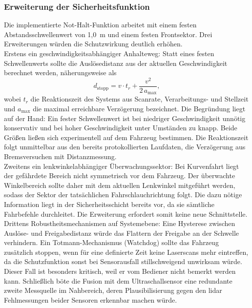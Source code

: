 \subsubsection{Erweiterung der Sicherheitsfunktion}
Die implementierte Not-Halt-Funktion arbeitet mit einem festen Abstandsschwellenwert von 1,0~m und einem festen Frontsektor. Drei Erweiterungen würden die Schutzwirkung deutlich erhöhen.
\\
Erstens ein geschwindigkeitsabhängiger Anhalteweg: Statt eines festen Schwellenwerts sollte die Auslösedistanz aus der aktuellen Geschwindigkeit berechnet werden, näherungsweise als
\[
    d_{\mathrm{stopp}} = v \cdot t_r + \frac{v^2}{2\,a_{\mathrm{max}}},
\]
wobei $t_r$ die Reaktionszeit des Systems aus Scanrate, Verarbeitungs- und Stellzeit und $a_{\mathrm{max}}$ die maximal erreichbare Verzögerung bezeichnet. Die Begründung liegt auf der Hand: Ein fester Schwellenwert ist bei niedriger Geschwindigkeit unnötig konservativ und bei hoher Geschwindigkeit unter Umständen zu knapp. Beide Größen ließen sich experimentell auf dem Fahrzeug bestimmen. Die Reaktionszeit folgt unmittelbar aus den bereits protokollierten Laufdaten, die Verzögerung aus Bremsversuchen mit Distanzmessung.
\\
Zweitens ein lenkwinkelabhängiger Überwachungssektor: Bei Kurvenfahrt liegt der gefährdete Bereich nicht symmetrisch vor dem Fahrzeug. Der überwachte Winkelbereich sollte daher mit dem aktuellen Lenkwinkel mitgeführt werden, sodass der Sektor der tatsächlichen Fahrschlauchrichtung folgt. Die dazu nötige Information liegt in der Sicherheitsschicht bereits vor, da sie sämtliche Fahrbefehle durchleitet. Die Erweiterung erfordert somit keine neue Schnittstelle.
\\
Drittens Robustheitsmechanismen auf Systemebene: Eine Hysterese zwischen Auslöse- und Freigabedistanz würde das Flattern der Freigabe an der Schwelle verhindern. Ein Totmann-Mechanismus (Watchdog) sollte das Fahrzeug zusätzlich stoppen, wenn für eine definierte Zeit keine Laserscans mehr eintreffen, da die Schutzfunktion sonst bei Sensorausfall stillschweigend unwirksam würde. Dieser Fall ist besonders kritisch, weil er vom Bediener nicht bemerkt werden kann. Schließlich böte die Fusion mit dem Ultraschallsensor eine redundante zweite Messquelle im Nahbereich, deren Plausibilisierung gegen den \gls{lidar} Fehlmessungen beider Sensoren erkennbar machen würde.

